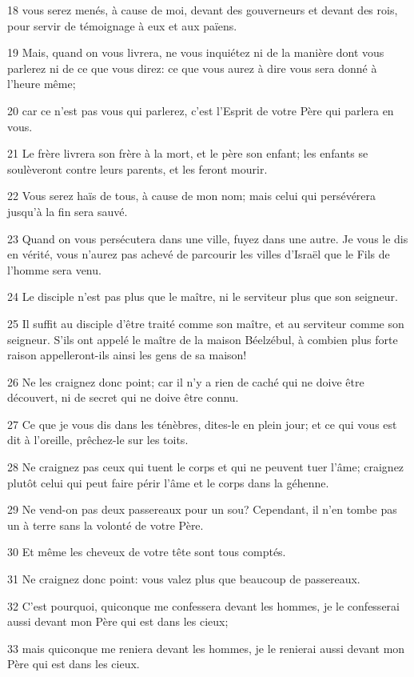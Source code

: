 \par 18 vous serez menés, à cause de moi, devant des gouverneurs et devant des rois, pour servir de témoignage à eux et aux païens.
\par 19 Mais, quand on vous livrera, ne vous inquiétez ni de la manière dont vous parlerez ni de ce que vous direz: ce que vous aurez à dire vous sera donné à l'heure même;
\par 20 car ce n'est pas vous qui parlerez, c'est l'Esprit de votre Père qui parlera en vous.
\par 21 Le frère livrera son frère à la mort, et le père son enfant; les enfants se soulèveront contre leurs parents, et les feront mourir.
\par 22 Vous serez haïs de tous, à cause de mon nom; mais celui qui persévérera jusqu'à la fin sera sauvé.
\par 23 Quand on vous persécutera dans une ville, fuyez dans une autre. Je vous le dis en vérité, vous n'aurez pas achevé de parcourir les villes d'Israël que le Fils de l'homme sera venu.
\par 24 Le disciple n'est pas plus que le maître, ni le serviteur plus que son seigneur.
\par 25 Il suffit au disciple d'être traité comme son maître, et au serviteur comme son seigneur. S'ils ont appelé le maître de la maison Béelzébul, à combien plus forte raison appelleront-ils ainsi les gens de sa maison!
\par 26 Ne les craignez donc point; car il n'y a rien de caché qui ne doive être découvert, ni de secret qui ne doive être connu.
\par 27 Ce que je vous dis dans les ténèbres, dites-le en plein jour; et ce qui vous est dit à l'oreille, prêchez-le sur les toits.
\par 28 Ne craignez pas ceux qui tuent le corps et qui ne peuvent tuer l'âme; craignez plutôt celui qui peut faire périr l'âme et le corps dans la géhenne.
\par 29 Ne vend-on pas deux passereaux pour un sou? Cependant, il n'en tombe pas un à terre sans la volonté de votre Père.
\par 30 Et même les cheveux de votre tête sont tous comptés.
\par 31 Ne craignez donc point: vous valez plus que beaucoup de passereaux.
\par 32 C'est pourquoi, quiconque me confessera devant les hommes, je le confesserai aussi devant mon Père qui est dans les cieux;
\par 33 mais quiconque me reniera devant les hommes, je le renierai aussi devant mon Père qui est dans les cieux.
